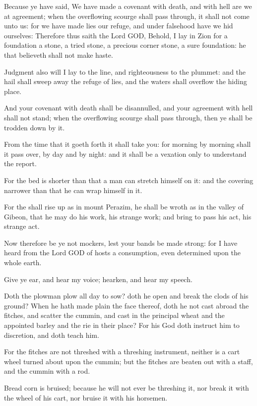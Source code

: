 \verse Because ye have said, We have made a covenant with death, and with hell are we at agreement; when the overflowing scourge shall pass through, it shall not come unto us: for we have made lies our refuge, and under falsehood have we hid ourselves: \verse Therefore thus saith the Lord GOD, Behold, I lay in Zion for a foundation a stone, a tried stone, a precious corner stone, a sure foundation: he that believeth shall not make haste.

\verse Judgment also will I lay to the line, and righteousness to the plummet: and the hail shall sweep away the refuge of lies, and the waters shall overflow the hiding place.

\verse And your covenant with death shall be disannulled, and your agreement with hell shall not stand; when the overflowing scourge shall pass through, then ye shall be trodden down by it.

\verse From the time that it goeth forth it shall take you: for morning by morning shall it pass over, by day and by night: and it shall be a vexation only to understand the report.

\verse For the bed is shorter than that a man can stretch himself on it: and the covering narrower than that he can wrap himself in it.

\verse For the \LORD shall rise up as in mount Perazim, he shall be wroth as in the valley of Gibeon, that he may do his work, his strange work; and bring to pass his act, his strange act.

\verse Now therefore be ye not mockers, lest your bands be made strong: for I have heard from the Lord GOD of hosts a consumption, even determined upon the whole earth.

\verse Give ye ear, and hear my voice; hearken, and hear my speech.

\verse Doth the plowman plow all day to sow? doth he open and break the clods of his ground?  \verse When he hath made plain the face thereof, doth he not cast abroad the fitches, and scatter the cummin, and cast in the principal wheat and the appointed barley and the rie in their place?  \verse For his God doth instruct him to discretion, and doth teach him.

\verse For the fitches are not threshed with a threshing instrument, neither is a cart wheel turned about upon the cummin; but the fitches are beaten out with a staff, and the cummin with a rod.

\verse Bread corn is bruised; because he will not ever be threshing it, nor break it with the wheel of his cart, nor bruise it with his horsemen.

